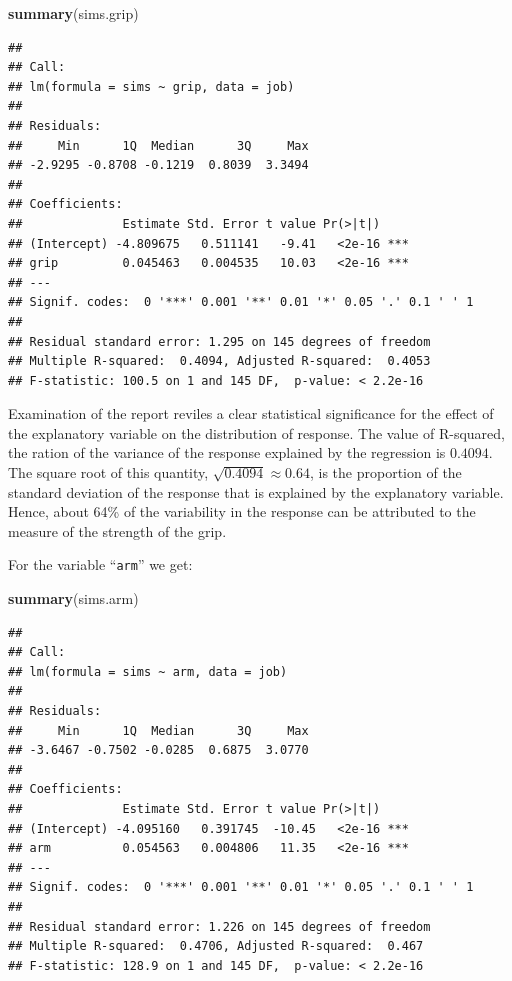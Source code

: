 \documentclass[
]{krantz}
\makeatletter
\newenvironment{Shaded}{\begin{snugshade}}{\end{snugshade}}
\newcommand{\KeywordTok}[1]{\textcolor[rgb]{0.13,0.29,0.53}{\textbf{#1}}}
\newcommand{\NormalTok}[1]{#1}
\newenvironment{kframe}{%
\medskip{}
\setlength{\fboxsep}{.8em}
 \def\at@end@of@kframe{}%
 \ifinner\ifhmode%
  \def\at@end@of@kframe{\end{minipage}}%
  \begin{minipage}{\columnwidth}%
 \fi\fi%
 \def\FrameCommand##1{\hskip\@totalleftmargin \hskip-\fboxsep
 \colorbox{shadecolor}{##1}\hskip-\fboxsep
     \hskip-\linewidth \hskip-\@totalleftmargin \hskip\columnwidth}%
 \MakeFramed {\advance\hsize-\width
   \@totalleftmargin\z@ \linewidth\hsize
   \@setminipage}}%
 {\par\unskip\endMakeFramed%
 \at@end@of@kframe}
\renewenvironment{Shaded}{\begin{kframe}}{\end{kframe}}
\theoremstyle{definition}
\theoremstyle{definition}
\theoremstyle{definition}
\theoremstyle{remark}
\makeatother
\begin{document}
\begin{Shaded}
\begin{Highlighting}[]
\KeywordTok{summary}\NormalTok{(sims.grip)}
\end{Highlighting}
\end{Shaded}

\begin{verbatim}
## 
## Call:
## lm(formula = sims ~ grip, data = job)
## 
## Residuals:
##     Min      1Q  Median      3Q     Max 
## -2.9295 -0.8708 -0.1219  0.8039  3.3494 
## 
## Coefficients:
##              Estimate Std. Error t value Pr(>|t|)    
## (Intercept) -4.809675   0.511141   -9.41   <2e-16 ***
## grip         0.045463   0.004535   10.03   <2e-16 ***
## ---
## Signif. codes:  0 '***' 0.001 '**' 0.01 '*' 0.05 '.' 0.1 ' ' 1
## 
## Residual standard error: 1.295 on 145 degrees of freedom
## Multiple R-squared:  0.4094, Adjusted R-squared:  0.4053 
## F-statistic: 100.5 on 1 and 145 DF,  p-value: < 2.2e-16
\end{verbatim}

Examination of the report reviles a clear statistical significance for
the effect of the explanatory variable on the distribution of response.
The value of R-squared, the ration of the variance of the response
explained by the regression is \(0.4094\). The square root of this
quantity, \(\sqrt{0.4094} \approx 0.64\), is the proportion of the
standard deviation of the response that is explained by the explanatory
variable. Hence, about 64\% of the variability in the response can be
attributed to the measure of the strength of the grip.

For the variable ``\texttt{arm}'' we get:

\begin{Shaded}
\begin{Highlighting}[]
\KeywordTok{summary}\NormalTok{(sims.arm)}
\end{Highlighting}
\end{Shaded}

\begin{verbatim}
## 
## Call:
## lm(formula = sims ~ arm, data = job)
## 
## Residuals:
##     Min      1Q  Median      3Q     Max 
## -3.6467 -0.7502 -0.0285  0.6875  3.0770 
## 
## Coefficients:
##              Estimate Std. Error t value Pr(>|t|)    
## (Intercept) -4.095160   0.391745  -10.45   <2e-16 ***
## arm          0.054563   0.004806   11.35   <2e-16 ***
## ---
## Signif. codes:  0 '***' 0.001 '**' 0.01 '*' 0.05 '.' 0.1 ' ' 1
## 
## Residual standard error: 1.226 on 145 degrees of freedom
## Multiple R-squared:  0.4706, Adjusted R-squared:  0.467 
## F-statistic: 128.9 on 1 and 145 DF,  p-value: < 2.2e-16
\end{verbatim}
\end{document}
